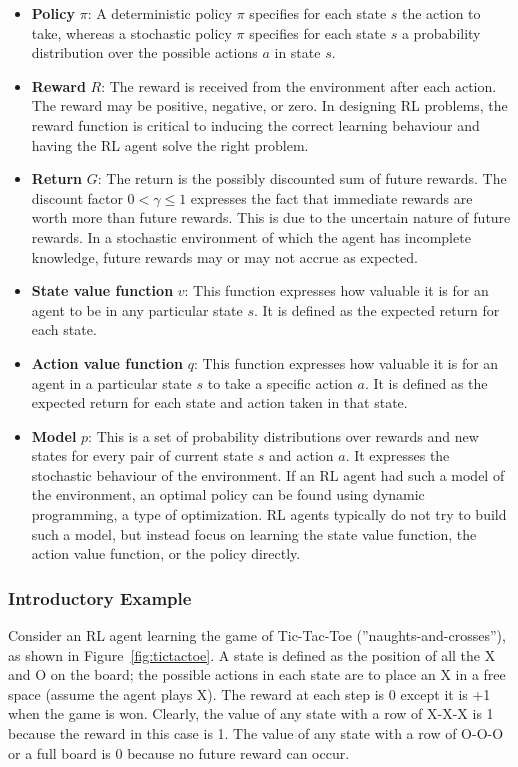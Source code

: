 \begin{itemize}
    \item \textbf{Policy} $\pi$: A deterministic policy $\pi$ specifies for each state $s$ the action to take, whereas a stochastic policy $\pi$ specifies for each state $s$  a probability distribution over the possible actions $a$ in state $s$.
    \item \textbf{Reward} $R$: The reward is received from the environment after each action. The reward may be positive, negative, or zero. In designing RL problems, the reward function is critical to inducing the correct learning behaviour and having the RL agent solve the right problem. 
    \item \textbf{Return} $G$: The return is the possibly discounted sum of future rewards. The discount factor $0 < \gamma \leq 1$ expresses the fact that immediate rewards are worth more than future rewards. This is due to the uncertain nature of future rewards. In a stochastic environment of which the agent has incomplete knowledge, future rewards may or may not accrue as expected.
    \item \textbf{State value function} $v$: This function expresses how valuable it is for an agent to be in any particular state $s$. It is defined as the expected return for each state.
    \item \textbf{Action value function} $q$: This function expresses how valuable it is for an agent in a particular state $s$ to take a specific action $a$. It is defined as the expected return for each state and action taken in that state.
    \item \textbf{Model} $p$: This is a set of probability distributions over rewards and new states for every pair of current state $s$ and action $a$. It expresses the stochastic behaviour of the environment. If an RL agent had such a model of the environment, an optimal policy can be found using dynamic programming, a type of optimization. RL agents typically do not try to build such a model, but instead focus on learning the state value function, the action value function, or the policy directly.
\end{itemize}

\subsubsection*{Introductory Example}

Consider an RL agent learning the game of Tic-Tac-Toe (''naughts-and-crosses''), as shown in Figure~\ref{fig:tictactoe}. A state is defined as the position of all the X and O on the board; the possible actions in each state are to place an X in a free space (assume the agent plays X). The reward at each step is 0 except it is +1 when the game is won. Clearly, the value of any state with a row of X-X-X is 1 because the reward in this case is 1. The value of any state with a row of O-O-O or a full board is 0 because no future reward can occur. 

